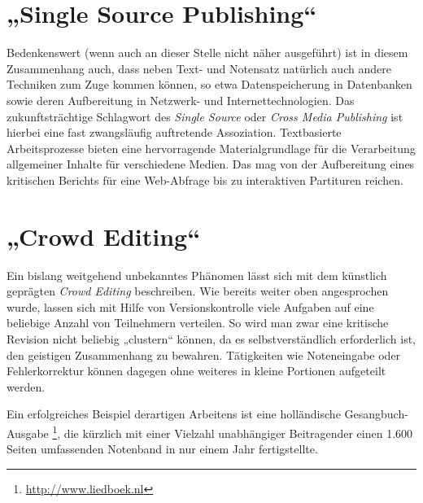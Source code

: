\documentclass[DIV=12]{scrreprt}
\begin{document}
\section{„Single Source Publishing“}
\label{sec:pt_single-source-publishing}
Bedenkenswert (wenn auch an dieser Stelle nicht näher ausgeführt) ist in diesem Zusammenhang auch, dass neben Text- und Notensatz natürlich auch andere Techniken zum Zuge kommen können, so etwa Datenspeicherung in Datenbanken sowie deren Aufbereitung in Netzwerk- und Internettechnologien.
Das zukunftsträchtige Schlagwort des \emph{Single Source} oder \emph{Cross Media Publishing} ist hierbei eine fast zwangsläufig auftretende Assoziation.
Textbasierte Arbeitsprozesse bieten eine hervorragende Materialgrundlage für die Verarbeitung allgemeiner Inhalte für verschiedene Medien.
Das mag von der Aufbereitung eines kritischen Berichts für eine Web-Abfrage bis zu interaktiven Partituren reichen.

\section{„Crowd Editing“}
\label{sec:pt_crowd-editing}
Ein bislang weitgehend unbekanntes Phänomen lässt sich mit dem künstlich geprägten \emph{Crowd Editing} beschreiben.
Wie bereits weiter oben angesprochen wurde, lassen sich mit Hilfe von Versionskontrolle viele Aufgaben auf eine beliebige Anzahl von Teilnehmern verteilen.
So wird man zwar eine kritische Revision nicht beliebig „clustern“ können, da es selbstverständlich erforderlich ist, den geistigen Zusammenhang zu bewahren.
Tätigkeiten wie Noteneingabe oder Fehlerkorrektur können dagegen ohne weiteres in kleine Portionen aufgeteilt werden.

Ein erfolgreiches Beispiel derartigen Arbeitens ist eine holländische Gesangbuch-Ausgabe%
\footnote{\url{http://www.liedboek.nl}},
die kürzlich mit einer Vielzahl unabhängiger Beitragender einen 1.600 Seiten umfassenden Notenband in nur einem Jahr fertigstellte.
\end{document}

